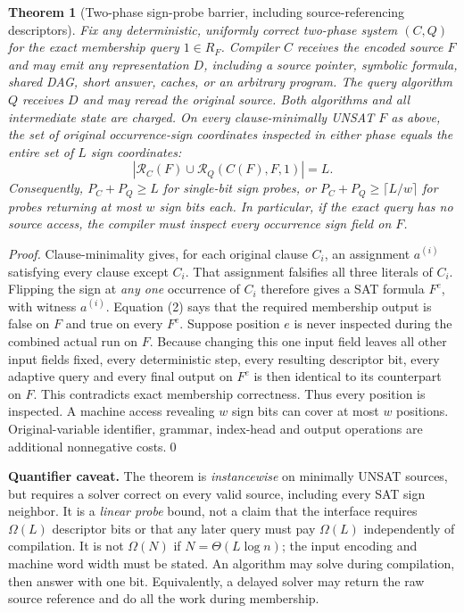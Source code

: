 \documentclass[11pt]{article}
\newtheorem{theorem}{Theorem}
\begin{document}
\begin{theorem}[Two-phase sign-probe barrier, including source-referencing descriptors]
Fix any deterministic, uniformly correct two-phase system $(C,Q)$ for the exact membership query $1\in R_F$. Compiler $C$ receives the encoded source $F$ and may emit \emph{any} representation $D$, including a source pointer, symbolic formula, shared DAG, short answer, caches, or an arbitrary program. The query algorithm $Q$ receives $D$ and may reread the original source. Both algorithms and all intermediate state are charged. On every clause-minimally UNSAT $F$ as above, the set of original occurrence-sign coordinates inspected in \emph{either} phase equals the entire set of $L$ sign coordinates:
\[
\boxed{\left|\mathcal R_C(F)\cup\mathcal R_Q(C(F),F,1)\right|=L.}\tag{3}
\]
Consequently, $P_C+P_Q\ge L$ for single-bit sign probes, or $P_C+P_Q\ge\lceil L/w\rceil$ for probes returning at most $w$ sign bits each. In particular, if the exact query has no source access, the compiler must inspect every occurrence sign field on $F$.
\end{theorem}
\begin{proof}
Clause-minimality gives, for each original clause $C_i$, an assignment $a^{(i)}$ satisfying every clause except $C_i$. That assignment falsifies all three literals of $C_i$. Flipping the sign at \emph{any one} occurrence of $C_i$ therefore gives a SAT formula $F^e$, with witness $a^{(i)}$. Equation (2) says that the required membership output is false on $F$ and true on every $F^e$. Suppose position $e$ is never inspected during the combined actual run on $F$. Because changing this one input field leaves all other input fields fixed, every deterministic step, every resulting descriptor bit, every adaptive query and every final output on $F^e$ is then identical to its counterpart on $F$. This contradicts exact membership correctness. Thus every position is inspected. A machine access revealing $w$ sign bits can cover at most $w$ positions. Original-variable identifier, grammar, index-head and output operations are additional nonnegative costs.\qed
\end{proof}

\noindent\textbf{Quantifier caveat.} The theorem is \emph{instancewise} on minimally UNSAT sources, but requires a solver correct on every valid source, including every SAT sign neighbor. It is a \emph{linear probe} bound, not a claim that the interface requires $\Omega(L)$ descriptor bits or that any later query must pay $\Omega(L)$ independently of compilation. It is not $\Omega(N)$ if $N=\Theta(L\log n)$; the input encoding and machine word width must be stated. An algorithm may solve during compilation, then answer with one bit. Equivalently, a delayed solver may return the raw source reference and do all the work during membership.
\end{document}
